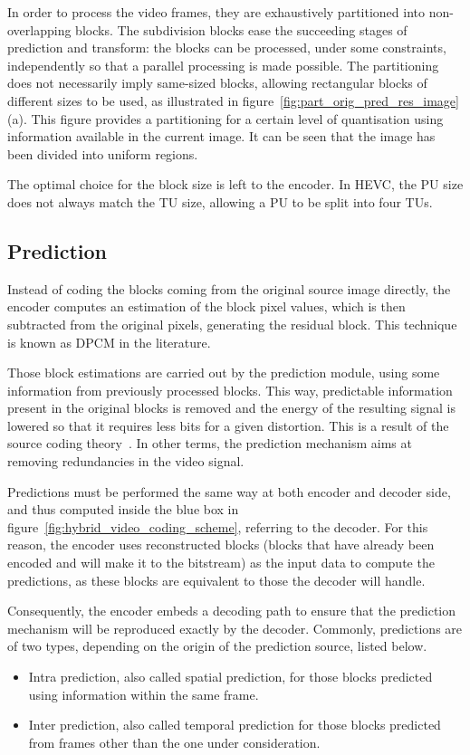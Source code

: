\documentclass[11pt,a4paper,openright,twoside]{book}
\numberwithin{equation}{section} %
\numberwithin{figure}{section} %
\numberwithin{table}{section} %
\begin{document}
In order to process the video frames, they are exhaustively partitioned into
non-overlapping blocks.
The subdivision blocks ease the succeeding stages of prediction and transform:
the blocks can be processed, under some constraints, independently so that a
parallel processing is made possible.
The partitioning does not necessarily imply same-sized blocks, allowing
rectangular blocks of different sizes to be used, as illustrated in
figure~\ref{fig:part_orig_pred_res_image} (a).
This figure provides a partitioning for a certain level of quantisation using
information available in the current image.
It can be seen that the image has been divided into uniform regions.

The optimal choice for the block size is left to the encoder.
In \ac{HEVC}, the \ac{PU} size does not always match the \ac{TU} size,
allowing a \ac{PU} to be split into four \acp{TU}.

\subsection{Prediction}
\label{sub:prediction}

Instead of coding the blocks coming from the original source image directly,
the encoder computes an estimation of the block pixel values, which is then
subtracted from the original pixels, generating the residual block.
This technique is known as \ac{DPCM} in the literature.

Those block estimations are carried out by the prediction module, using some
information from previously processed blocks.
This way, predictable information present in the original blocks is removed
and the energy of the resulting signal is lowered so that it requires less
bits for a given distortion.
This is a result of the source coding
theory~\cite{jayant-84-digital-coding-waveforms}.
In other terms, the prediction mechanism aims at removing redundancies in the
video signal.

Predictions must be performed the same way at both encoder and decoder side,
and thus computed inside the blue box in
figure~\ref{fig:hybrid_video_coding_scheme}, referring to the decoder.
For this reason, the encoder uses reconstructed blocks (blocks that have
already been encoded and will make it to the bitstream) as the input
data to compute the predictions, as these blocks are equivalent to those the
decoder will handle.

Consequently, the encoder embeds a decoding path to ensure that the prediction
mechanism will be reproduced exactly by the decoder.
Commonly, predictions are of two types, depending on the origin of
the prediction source, listed below.
\begin{itemize}
	\item Intra prediction, also called spatial prediction, for those blocks
		predicted using information within the same frame.
	\item Inter prediction, also called temporal prediction for those blocks
		predicted from frames other than the one under consideration.
\end{itemize}
\end{document}
